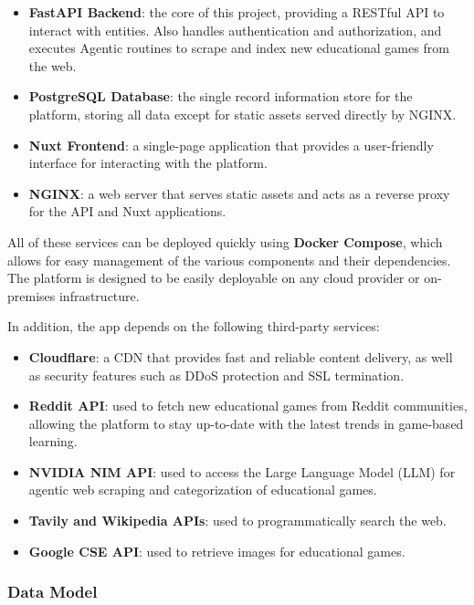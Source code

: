 \documentclass[11pt,italian,a4paper]{article}
\begin{document}
\begin{itemize}
    \item \textbf{FastAPI Backend}: the core of this project, providing a RESTful API to interact with entities. Also handles authentication and authorization, and executes Agentic routines to scrape and index new educational games from the web.
    \item \textbf{PostgreSQL Database}: the single record information store for the platform, storing all data except for static assets served directly by NGINX.
    \item \textbf{Nuxt Frontend}: a single-page application that provides a user-friendly interface for interacting with the platform.
    \item \textbf{NGINX}: a web server that serves static assets and acts as a reverse proxy for the API and Nuxt applications.
\end{itemize}

All of these services can be deployed quickly using \textbf{Docker Compose}, which allows for easy management of the various components and their dependencies. The platform is designed to be easily deployable on any cloud provider or on-premises infrastructure.

In addition, the app depends on the following third-party services:
\begin{itemize}
    \item \textbf{Cloudflare}: a CDN that provides fast and reliable content delivery, as well as security features such as DDoS protection and SSL termination.
    \item \textbf{Reddit API}: used to fetch new educational games from Reddit communities, allowing the platform to stay up-to-date with the latest trends in game-based learning.
    \item \textbf{NVIDIA NIM API}: used to access the Large Language Model (LLM) for agentic web scraping and categorization of educational games.
    \item \textbf{Tavily and Wikipedia APIs}: used to programmatically search the web.
    \item \textbf{Google CSE API}: used to retrieve images for educational games.
\end{itemize}

\subsubsection{Data Model}
\end{document}
